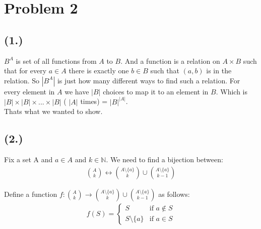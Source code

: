 \documentclass{article}
\begin{document}
\section*{Problem 2}
\subsection*{(1.)}
\(B^A\) is set of all functions from \(A\) to \(B\). And a function is a relation on \(A \times B\) such that for every \(a \in A\) there is exactly one \(b \in B\) such that \((a, b)\) is in the relation.
So \(|B^A|\) is just how many different ways to find such a relation. For every element in \(A\) we have \(|B|\) choices to map it to an element in \(B\).
Which is \(|B| \times |B| \times ... \times |B|\) ( \(|A|\) times) = \(|B|^{|A|}\). \\
Thats what we wanted to show.

\subsection*{(2.)}
Fix a set A and \(a \in A\) and \(k \in \mathbb{N}\). We need to find a bijection between:
\begin{align*}
   \binom{A}{k} \leftrightarrow \binom{A \setminus \{a\}}{k} \cup \binom{A \setminus \{a\}}{k-1}
\end{align*}

Define a function \( f: \binom{A}{k} \to \binom{A \setminus \{a\}}{k} \cup \binom{A \setminus \{a\}}{k-1} \) as follows:
\begin{align*}
   f(S) = 
   \begin{cases} 
      S & \text{if } a \notin S \\
      S \setminus \{a\} & \text{if } a \in S 
   \end{cases}
\end{align*}
\end{document}
